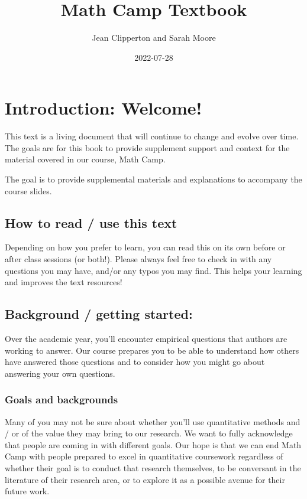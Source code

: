 \documentclass[
]{book}
\title{Math Camp Textbook}
\author{Jean Clipperton and Sarah Moore}
\date{2022-07-28}
\begin{document}
\maketitle

{
\setcounter{tocdepth}{1}
\tableofcontents
}
\hypertarget{introduction-welcome}{%
\chapter{Introduction: Welcome!}\label{introduction-welcome}}

This text is a living document that will continue to change and evolve over time. The goals are for this book to provide supplement support and context for the material covered in our course, Math Camp.

The goal is to provide supplemental materials and explanations to accompany the course slides.

\hypertarget{how-to-read-use-this-text}{%
\section{How to read / use this text}\label{how-to-read-use-this-text}}

Depending on how you prefer to learn, you can read this on its own before or after class sessions (or both!). Please always feel free to check in with any questions you may have, and/or any typos you may find. This helps your learning and improves the text resources!

\hypertarget{background-getting-started}{%
\section{Background / getting started:}\label{background-getting-started}}

Over the academic year, you'll encounter empirical questions that authors are working to answer. Our course prepares you to be able to understand how others have answered those questions and to consider how you might go about answering your own questions.

\hypertarget{goals-and-backgrounds}{%
\subsection{Goals and backgrounds}\label{goals-and-backgrounds}}

Many of you may not be sure about whether you'll use quantitative methods and / or of the value they may bring to our research. We want to fully acknowledge that people are coming in with different goals. Our hope is that we can end Math Camp with people prepared to excel in quantitative coursework regardless of whether their goal is to conduct that research themselves, to be conversant in the literature of their research area, or to explore it as a possible avenue for their future work.
\end{document}

